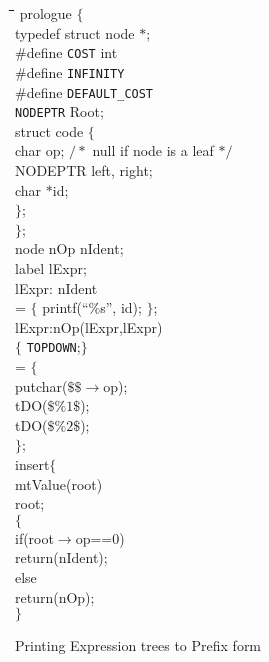 \begin{figure}[tp]
\begin{tabbing}
\hspace{1in}\=\hspace{1in}\=\hspace{1in}\=\hspace{1in}\=
\hspace{1in}\=\hspace{1in}\=\hspace{1in}\=\hspace{1in}\=\kill
prologue \> $\{$\\[4pt]
typedef \> struct node $*$\>;\\
\#define \> {\tt COST} \>\> int\\
\#define \> {\tt INFINITY}\>\\
\#define \> {\tt DEFAULT\_COST} \>\\[4pt]
{\tt NODEPTR} Root;\\
struct code \> $\{$\\
\> char op; \> \> $/*$ null if node is a leaf $*/$\\
\> NODEPTR left, right;\\
\> char $*$id;\\
$\}$;\\[4pt]
$\}$;\\[6pt]
node \> nOp nIdent;\\
label \> lExpr;\\[6pt]
lExpr:\> nIdent\\
\>= $\{$ printf(``$\%$s'', id); $\}$;\\[4pt]
lExpr:\>nOp(lExpr,lExpr)\\
\>$\{$ {\tt TOPDOWN};$\}$\\
\>= $\{$\\
\>\>putchar($\$\$\to$op);\\
\>\>tDO($\$\%1\$$);\\
\>\>tDO($\$\%2\$$);\\
\>$\}$;\\[6pt]
insert\>$\{$\\[4pt]
mtValue(root)\\
 root;\\
$\{$\\
\>if(root$\to$op==0)\\
\>\>return(nIdent);\\
\>else\\
\>\>return(nOp);\\
$\}$\\[4pt]
\end{tabbing}
\caption{Printing Expression trees to Prefix form}
\end{figure}
